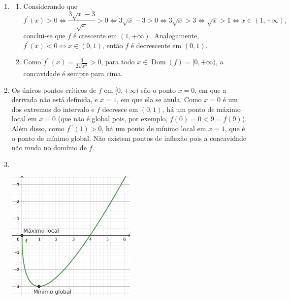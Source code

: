 \documentclass[12pt,a4paper]{article}
\newcommand*\dom[1]{\operatorname{Dom}\left(#1\right)}
\begin{document}
\begin{ExerciseList}
\begin{enumerate}
\item
\begin{enumerate}
\item Considerando que
\[
f^\prime(x) > 0
\Leftrightarrow
\frac{3\sqrt{x}-3}{\sqrt{x}} > 0
\Leftrightarrow
3\sqrt{x}-3 > 0
\Leftrightarrow
3\sqrt{x} > 3
\Leftrightarrow
\sqrt{x} > 1
\Leftrightarrow
x \in (1, +\infty),
\]
conclui-se que $f$ é crescente em $(1, +\infty)$. Analogamente, $f^\prime(x) < 0 \Leftrightarrow x \in (0,1)$, então $f$ é decrescente em $(0,1)$.
\item Como $f^{\prime\prime}(x) = \frac{3}{2 \sqrt{x^3}} > 0$, para todo $x \in \dom{f} = [0,+\infty)$, a concavidade é sempre para cima.
\end{enumerate}
\item Os únicos pontos críticos de $f$ em $[0,+\infty)$ são o ponto $x = 0$, em que a derivada não está definida, e $x = 1$, em que ela se anula. Como $x=0$ é um dos extremos do intervalo e $f$ decresce em $(0,1)$, há um ponto de máximo local em $x = 0$ (que não é global pois, por exemplo, $f(0) = 0 < 9 = f(9)$). Além disso, como $f^{\prime\prime}(1) >0$, há um ponto de mínimo local em $x=1$, que é o ponto de mínimo global. Não existem pontos de inflexão pois a concavidade não muda no domínio de $f$.
\item \
\begin{center}
\includegraphics[width=0.5\textwidth]{img/prova-3-tads-graph}
\end{center}
\end{enumerate}



\end{ExerciseList}
\end{document}

